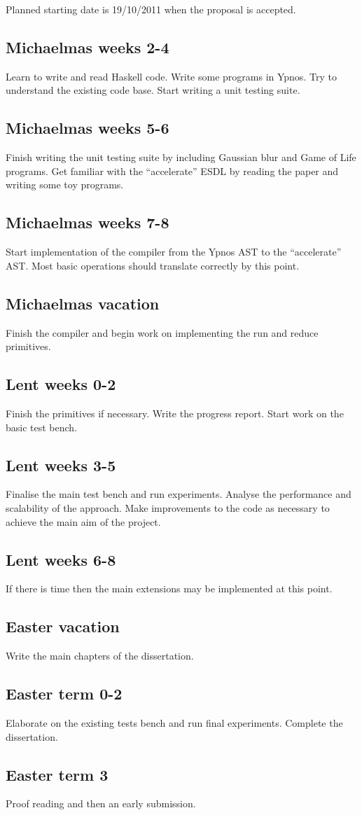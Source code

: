 Planned starting date is 19/10/2011 when the proposal is accepted.

\subsection*{Michaelmas weeks 2-4} Learn to write and read Haskell code. Write 
some programs in Ypnos. Try to understand the existing code base. Start writing 
a unit testing suite.

\subsection*{Michaelmas weeks 5-6} Finish writing the unit testing suite by 
including Gaussian blur and Game of Life programs. Get familiar with the 
``accelerate'' ESDL by reading the paper and writing some toy programs. 

\subsection*{Michaelmas weeks 7-8} Start implementation of the compiler from 
the Ypnos AST to the ``accelerate'' AST. Most basic operations should translate 
correctly by this point.

\subsection*{Michaelmas vacation} Finish the compiler and begin work on 
implementing the run and reduce primitives.

\subsection*{Lent weeks 0-2} Finish the primitives if necessary. Write the 
progress report. Start work on the basic test bench.

\subsection*{Lent weeks 3-5} Finalise the main test bench and run experiments.  
Analyse the performance and scalability of the approach. Make improvements to 
the code as necessary to achieve the main aim of the project. 

\subsection*{Lent weeks 6-8} If there is time then the main extensions may be 
implemented at this point.

\subsection*{Easter vacation} Write the main chapters of the dissertation.

\subsection*{Easter term 0-2} Elaborate on the existing tests bench and run 
final experiments. Complete the dissertation.

\subsection*{Easter term 3} Proof reading and then an early submission.  


